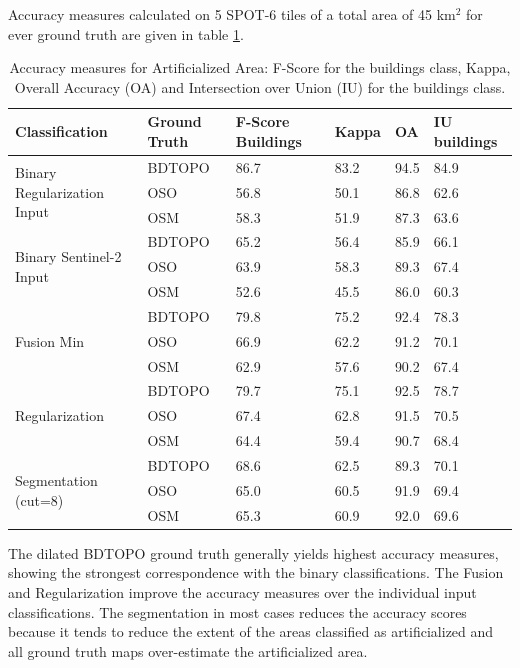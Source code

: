 \documentclass[10pt]{article}
\begin{document}
Accuracy measures calculated on 5 SPOT-6 tiles of a total area of 45 km$^2$ for ever ground truth are given in table \ref{table:accuracy-bin}.
\begin{table}[H]
\centering
\begin{tabular}{llp{1.5cm}llp{1.5cm}}
\toprule
\textbf{Classification} & \textbf{Ground Truth} & \textbf{F-Score Buildings} & \textbf{Kappa} & \textbf{OA} & \textbf{IU buildings} \\\hline\hline
\multirow{3}{*}{Binary Regularization Input} & BDTOPO & 86.7 & 83.2 & 94.5 & 84.9\\
 & OSO & 56.8 & 50.1 & 86.8 & 62.6\\
 & OSM & 58.3 & 51.9 & 87.3 & 63.6\\\hline
\multirow{3}{*}{Binary Sentinel-2 Input} & BDTOPO & 65.2 & 56.4 & 85.9 & 66.1 \\
 & OSO & 63.9 & 58.3 & 89.3 & 67.4\\
 & OSM & 52.6 & 45.5 & 86.0 & 60.3\\\hline
\multirow{3}{*}{Fusion Min} & BDTOPO & 79.8 & 75.2 & 92.4 &  78.3 \\
& OSO & 66.9 & 62.2 & 91.2 & 70.1\\
 & OSM & 62.9 & 57.6 & 90.2 &  67.4 \\\hline
 \multirow{3}{*}{Regularization} & BDTOPO & 79.7 & 75.1 & 92.5 & 78.7 \\
 & OSO & 67.4 & 62.8 & 91.5 & 70.5 \\
 & OSM & 64.4 & 59.4 & 90.7 & 68.4 \\\hline
 \multirow{3}{*}{Segmentation (cut=8)} & BDTOPO & 68.6 & 62.5 & 89.3 & 70.1 \\
 & OSO & 65.0 & 60.5 & 91.9 & 69.4 \\
 & OSM & 65.3 & 60.9 & 92.0 & 69.6\\\bottomrule
\end{tabular}
\caption{Accuracy measures for Artificialized Area: F-Score for the buildings class, Kappa, Overall Accuracy (OA) and Intersection over Union (IU) for the buildings class.}
\label{table:accuracy-bin}
\end{table}
The dilated BDTOPO ground truth generally yields highest accuracy measures, showing the strongest correspondence with the binary classifications. The Fusion and Regularization improve the accuracy measures over the individual input classifications. The segmentation in most cases reduces the accuracy scores because it tends to reduce the extent of the areas classified as artificialized and all ground truth maps over-estimate the artificialized area.
\end{document}
